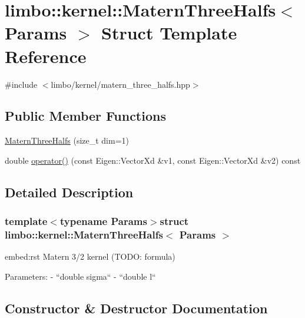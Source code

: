 \hypertarget{structlimbo_1_1kernel_1_1_matern_three_halfs}{}\section{limbo\+:\+:kernel\+:\+:Matern\+Three\+Halfs$<$ Params $>$ Struct Template Reference}
\label{structlimbo_1_1kernel_1_1_matern_three_halfs}


{\ttfamily \#include $<$limbo/kernel/matern\+\_\+three\+\_\+halfs.\+hpp$>$}

\subsection*{Public Member Functions}
\begin{DoxyCompactItemize}
\item 
\hyperlink{structlimbo_1_1kernel_1_1_matern_three_halfs_a2f46e1fb1e7239e1f1dccd422dee576e}{Matern\+Three\+Halfs} (size\+\_\+t dim=1)
\item 
double \hyperlink{structlimbo_1_1kernel_1_1_matern_three_halfs_affe5c6971e6afe32881603b857958a83}{operator()} (const Eigen\+::\+Vector\+Xd \&v1, const Eigen\+::\+Vector\+Xd \&v2) const 
\end{DoxyCompactItemize}


\subsection{Detailed Description}
\subsubsection*{template$<$typename Params$>$struct limbo\+::kernel\+::\+Matern\+Three\+Halfs$<$ Params $>$}

\begin{DoxyVerb}embed:rst
 Matern 3/2 kernel (TODO: formula)

 Parameters:
  - ``double sigma``
  - ``double l``\end{DoxyVerb}
 

\subsection{Constructor \& Destructor Documentation}
\hypertarget{structlimbo_1_1kernel_1_1_matern_three_halfs_a2f46e1fb1e7239e1f1dccd422dee576e}{}
